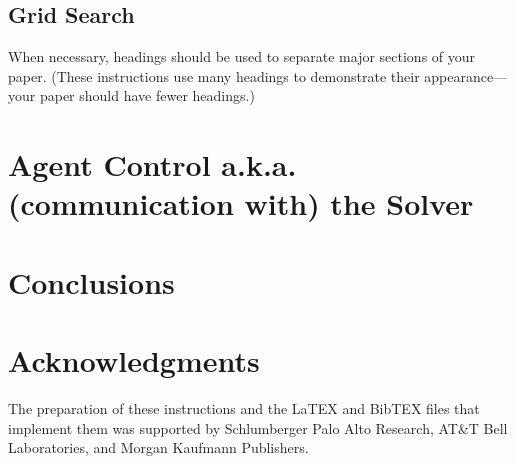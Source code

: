 \documentclass{article}
\begin{document}
\subsection{Grid Search}

When necessary, headings should be used to separate major sections of your
paper.
(These instructions use many headings to demonstrate their
appearance---your paper should have fewer headings.)


\section{Agent Control a.k.a. (communication with) the Solver}

\section{Conclusions}

\section*{Acknowledgments}
The preparation of these instructions and the LaTEX and BibTEX files that implement them was supported by Schlumberger Palo Alto Research, AT\&T Bell Laboratories, and Morgan Kaufmann Publishers.


%
%


\end{document}
